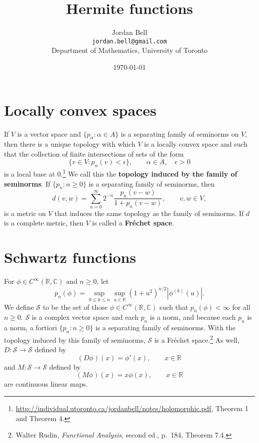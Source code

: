 \documentclass{article}
\theoremstyle{definition}
\begin{document}
\title{Hermite functions}
\author{Jordan Bell\\ \texttt{jordan.bell@gmail.com}\\Department of Mathematics, University of Toronto}
\date{\today}

\maketitle


\section{Locally convex spaces}
If $V$ is a vector space and $\{p_\alpha: \alpha \in A\}$ is a separating family of seminorms on $V$,
then there is a unique  topology
with which $V$  is a locally convex space and such that the collection of
finite intersections of  sets of the form
\[
\{v \in V: p_\alpha(v)<\epsilon\},\qquad \alpha \in A,\quad \epsilon>0
\]
is a local base at $0$.\footnote{\url{http://individual.utoronto.ca/jordanbell/notes/holomorphic.pdf},
Theorem 1 and Theorem 4.}  We call this the \textbf{topology induced by the family of seminorms}.
If $\{p_n: n \geq 0\}$ is a separating family of seminorms, then 
\[
d(v,w) = \sum_{n=0}^\infty 2^{-n} \frac{p_n(v-w)}{1+p_n(v-w)}, \qquad v,w \in V,
\]
is a metric on $V$ that induces the same topology as the family of seminorms. 
If $d$ is a complete metric, then $V$ is called a \textbf{Fr\'echet space}. 




\section{Schwartz functions}
For $\phi \in C^\infty(\mathbb{R},\mathbb{C})$ and $n \geq 0$,
let 
\[
p_n(\phi) =\sup_{0 \leq k \leq n} \sup_{u \in \mathbb{R}} (1+u^2)^{n/2} |\phi^{(k)}(u)|.
\]
We define $\mathscr{S}$ to be the set of those 
$\phi \in C^\infty(\mathbb{R},\mathbb{C})$ such that $p_n(\phi)<\infty$ for all $n \geq 0$. 
$\mathscr{S}$ is a complex vector space 
and each $p_n$ is a norm, and
because each $p_n$ is a norm, a fortiori $\{p_n:  n \geq 0\}$ is a separating family of seminorms.
With the topology induced by this family of seminorms, $\mathscr{S}$ is a Fr\'echet space.\footnote{Walter
Rudin, {\em Functional Analysis}, second ed., p.~184, Theorem 7.4.}
As well, $D:\mathscr{S} \to \mathscr{S}$ defined by
\[
(D\phi)(x) = \phi'(x),\qquad x \in \mathbb{R}
\]
and
$M:\mathscr{S} \to \mathscr{S}$ defined by
\[
(M\phi)(x) = x \phi(x),\qquad x \in \mathbb{R}
\]
are continuous linear maps.
\end{document}
